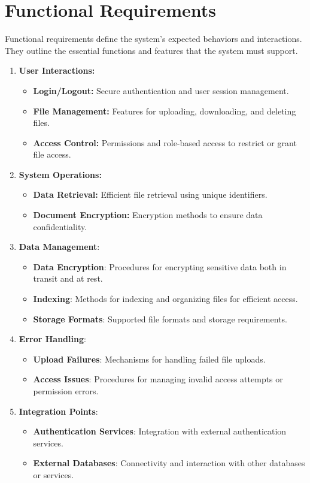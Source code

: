\documentclass[12pt,a4paper]{report}
\begin{document}
\section{Functional Requirements}

Functional requirements define the system’s expected behaviors and interactions. They outline the essential functions and features that the system must support.
\begin{enumerate}

\item \textbf{ User Interactions:}
    \begin{itemize}
        \item \textbf{Login/Logout:} Secure authentication and user session management.
        \item \textbf{File Management:} Features for uploading, downloading, and deleting files.
        \item \textbf{Access Control:} Permissions and role-based access to restrict or grant file access.
    \end{itemize}
\item \textbf{System Operations:}
    \begin{itemize}
        \item \textbf{Data Retrieval:} Efficient file retrieval using unique identifiers.
        \item \textbf{Document Encryption:} Encryption methods to ensure data confidentiality.
    \end{itemize}
\item \textbf{Data Management}:
    \begin{itemize}
        \item \textbf{Data Encryption}: Procedures for encrypting sensitive data both in transit and at rest.
        \item \textbf{Indexing}: Methods for indexing and organizing files for efficient access.
        \item \textbf{Storage Formats}: Supported file formats and storage requirements.
    \end{itemize}
\item \textbf{Error Handling}:
    \begin{itemize}
        \item \textbf{Upload Failures}: Mechanisms for handling failed file uploads.
        \item \textbf{Access Issues}: Procedures for managing invalid access attempts or permission errors.
    \end{itemize}
\item \textbf{Integration Points}:
    \begin{itemize}
        \item \textbf{Authentication Services}: Integration with external authentication services.
        \item \textbf{External Databases}: Connectivity and interaction with other databases or services.
    \end{itemize}
    
\end{enumerate}
\end{document}
